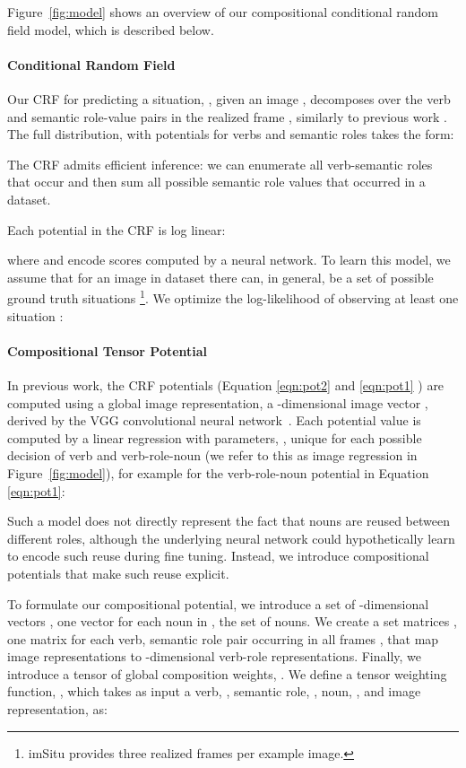 \documentclass[10pt,twocolumn,letterpaper]{article}
\begin{document}
Figure~\ref{fig:model} shows an overview of our compositional conditional random field model, which is described below.

\paragraph{Conditional Random Field} Our CRF for predicting a situation, , given an image , decomposes over the verb  and semantic role-value pairs  in the realized frame , similarly to previous work \cite{yatskar2016}. 
The full distribution, with potentials for verbs  and semantic roles  takes the form:

The CRF admits efficient inference: we can enumerate all verb-semantic roles that occur and then sum all possible semantic role values that occurred in a dataset. 


Each potential in the CRF is log linear:


where  and  encode scores computed by a neural network.
To learn this model, we assume that for an image  in dataset  there can, in general, be a set  of possible ground truth situations \footnote{imSitu provides three realized frames per example image.}.
We optimize the log-likelihood of observing at least one situation :





\paragraph{Compositional Tensor Potential}
In previous work, the CRF potentials (Equation \ref{eqn:pot2} and \ref{eqn:pot1} ) are computed using a global image representation, a -dimensional image vector , derived by the VGG convolutional neural network~\cite{vgg}.
Each potential value is computed by a linear regression with parameters, , unique for each possible decision of verb and verb-role-noun (we refer to this as image regression in Figure~\ref{fig:model}), for example for the verb-role-noun potential in Equation \ref{eqn:pot1}:



Such a model does not directly represent the fact that nouns are reused between different roles, although the underlying neural network could hypothetically learn to encode such reuse during fine tuning. 
Instead, we introduce compositional potentials that make such reuse explicit. 


To formulate our compositional potential, we introduce a set of -dimensional vectors , one vector for each noun in , the set of nouns.
We create a set matrices , one matrix for each verb, semantic role pair occurring in all frames , that map image representations to -dimensional verb-role representations.
Finally, we introduce a tensor of global composition weights, .
We define a tensor weighting function, , which takes as input a verb, , semantic role, , noun, , and image representation,  as:
\end{document}

